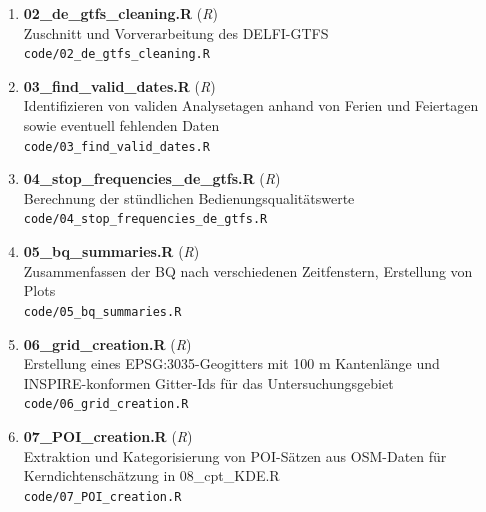 \begin{enumerate}[label=B\arabic*, ref=B\arabic*, leftmargin=*, itemsep=0.5em, topsep=0.3em]
\begin{enumerate}[label=B\arabic{enumi}-\arabic*, ref=B\arabic{enumi}-\arabic*, leftmargin=*, itemsep=0.5em, topsep=0.3em]
\expandafter\label\expandafter{\appendixlabelkey}
\item \textbf{02\_de\_gtfs\_cleaning.R} \textnormal{(\textit{R})}\\
Zuschnitt und Vorverarbeitung des DELFI-GTFS\\
\texttt{\small code/02\_de\_gtfs\_cleaning.R}
\edef\appendixlabelkey{app:B\arabic{enumi}-\arabic{enumii}}
\expandafter\label\expandafter{\appendixlabelkey}
\item \textbf{03\_find\_valid\_dates.R} \textnormal{(\textit{R})}\\
Identifizieren von validen Analysetagen anhand von Ferien und Feiertagen sowie eventuell fehlenden Daten\\
\texttt{\small code/03\_find\_valid\_dates.R}
\edef\appendixlabelkey{app:B\arabic{enumi}-\arabic{enumii}}
\expandafter\label\expandafter{\appendixlabelkey}
\item \textbf{04\_stop\_frequencies\_de\_gtfs.R} \textnormal{(\textit{R})}\\
Berechnung der stündlichen Bedienungsqualitätswerte\\
\texttt{\small code/04\_stop\_frequencies\_de\_gtfs.R}
\edef\appendixlabelkey{app:B\arabic{enumi}-\arabic{enumii}}
\expandafter\label\expandafter{\appendixlabelkey}
\item \textbf{05\_bq\_summaries.R} \textnormal{(\textit{R})}\\
Zusammenfassen der BQ nach verschiedenen Zeitfenstern, Erstellung von Plots\\
\texttt{\small code/05\_bq\_summaries.R}
\edef\appendixlabelkey{app:B\arabic{enumi}-\arabic{enumii}}
\expandafter\label\expandafter{\appendixlabelkey}
\item \textbf{06\_grid\_creation.R} \textnormal{(\textit{R})}\\
Erstellung eines EPSG:3035-Geogitters mit 100 m Kantenlänge und INSPIRE-konformen Gitter-Ids für das Untersuchungsgebiet\\
\texttt{\small code/06\_grid\_creation.R}
\edef\appendixlabelkey{app:B\arabic{enumi}-\arabic{enumii}}
\expandafter\label\expandafter{\appendixlabelkey}
\item \textbf{07\_POI\_creation.R} \textnormal{(\textit{R})}\\
Extraktion und Kategorisierung von POI-Sätzen aus OSM-Daten für Kerndichtenschätzung in 08\_cpt\_KDE.R\\
\texttt{\small code/07\_POI\_creation.R}
\edef\appendixlabelkey{app:B\arabic{enumi}-\arabic{enumii}}
\expandafter\label\expandafter{\appendixlabelkey}

\end{enumerate}
\end{enumerate}
